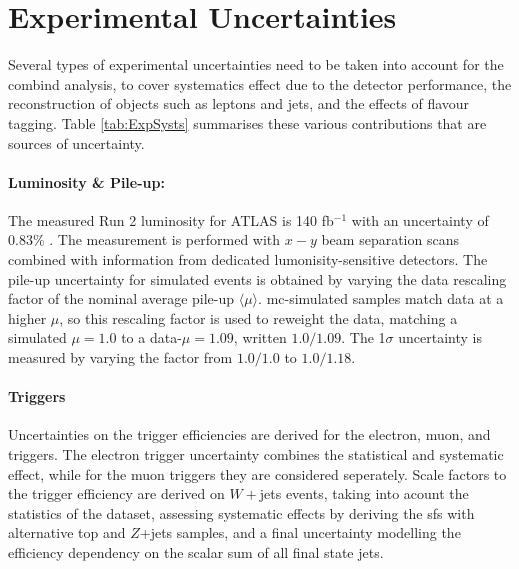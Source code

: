 \section{Experimental Uncertainties}\label{sec-unc} %
Several types of experimental uncertainties need to be taken into account for the combind analysis, to cover systematics effect due to the detector performance, the reconstruction of objects such as leptons and jets, and the effects of flavour tagging. Table \ref{tab:ExpSysts} summarises these various contributions that are sources of uncertainty.


\paragraph{Luminosity \& Pile-up:} The measured Run 2 luminosity for ATLAS is 140 fb$^{-1}$ with an uncertainty of 0.83\% \cite{ATLAS:2022hro}. The measurement is performed with $x-y$ beam separation scans combined with information from dedicated lumonisity-sensitive detectors. The pile-up uncertainty for simulated events is obtained by varying the data rescaling factor of the nominal average pile-up $\langle \mu \rangle$. \gls{mc}-simulated samples match data at a higher $\mu$, so this rescaling factor is used to reweight the data, matching a simulated $\mu = 1.0$ to a data-$\mu = 1.09$, written $1.0/1.09$. The 1$\sigma$ uncertainty is measured by varying the factor from $1.0/1.0$ to $1.0/1.18$. %

\paragraph{Triggers} Uncertainties on the trigger efficiencies are derived for the electron, muon, and \etm triggers. The electron trigger uncertainty combines the statistical and systematic effect, while for the muon triggers they are considered seperately. Scale factors to the \etm trigger efficiency are derived on $W+$jets events, taking into acount the statistics of the dataset, assessing systematic effects by deriving the \gls{sf}s with alternative top and $Z$+jets samples, and a final uncertainty modelling the efficiency dependency on the scalar sum of all final state jets. %

